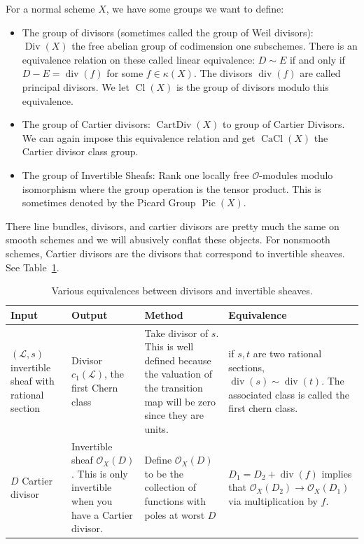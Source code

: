 \documentclass[12pt]{article}
\numberwithin{equation}{section}
\theoremstyle{definition}
\theoremstyle{remark}
\newcommand{\Ocal}{\mathcal{O}}
\newcommand{\Div}{\operatorname{Div}}
\newcommand{\CartDiv}{\operatorname{CartDiv}}
\newcommand{\CaCl}{\operatorname{CaCl}}
\newcommand{\Pic}{\operatorname{Pic}}
\renewcommand{\div}{\operatorname{div}}
\newcommand{\Cl}{\operatorname{Cl}}
\newcommand{\Lcal}{\mathcal{L}}
\begin{document}
For a normal scheme $X$, we have some groups we want to define:
\begin{itemize}
	\item The group of divisors (sometimes called the group of Weil divisors): $\Div(X)$ the free abelian group of codimension one subschemes.
	There is an equivalence relation on these called linear equivalence: $D \sim E$ if and only if $D-E = \div(f)$ for some $f \in \kappa(X)$. 
	The divisors $\div(f)$ are called principal divisors.
	We let $\Cl(X)$ is the group of divisors modulo this equivalence. 
	\item The group of Cartier divisors: $\CartDiv(X)$ to group of Cartier Divisors. 
	We can again impose this equivalence relation and get $\CaCl(X)$ the Cartier divisor class group. 
	\item The group of Invertible Sheafs: Rank one locally free $\mathcal O$-modules modulo isomorphism where the group operation is the tensor product. This is sometimes denoted by the Picard Group $\Pic(X)$.
\end{itemize}
There line bundles, divisors, and cartier divisors are pretty much the same on smooth schemes and we will abusively conflat these objects.
For nonsmooth schemes, Cartier divisors are the divisors that correspond to invertible sheaves. 
See Table~\ref{tab:invertible-and-divisors}.
\begin{table}[h]
	\begin{center}
		\begin{longtable}{|p{1in}|p{1in}|p{2in}|p{2in}|}
			\hline Input & Output & Method & Equivalence \\ \hline
			$(\Lcal,s)$ invertible sheaf with rational section & Divisor $c_1(\Lcal)$, the first Chern class & Take divisor of $s$.
			This is well defined because the valuation of the transition map will be zero since they are units. & if $s,t$ are two rational sections, $\div(s) \sim \div(t)$. 
			The associated class is called the first chern class.\\ \hline
			$D$ Cartier divisor & Invertible sheaf $\Ocal_X(D)$.
			This is only invertible when you have a Cartier divisor. & Define $\Ocal_X(D)$ to be the collection of functions with poles at worst $D$ & $D_1= D_2 +\div(f)$ implies that $\Ocal_X(D_2) \to \Ocal_X(D_1)$ via multiplication by $f$. \\ \hline
		\end{longtable}
	\end{center}
	\caption{Various equivalences between divisors and invertible sheaves.}\label{tab:invertible-and-divisors}
\end{table}
\end{document}
